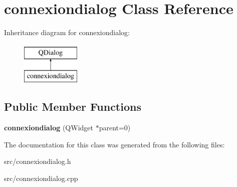 \hypertarget{classconnexiondialog}{\section{connexiondialog Class Reference}
\label{classconnexiondialog}
}
Inheritance diagram for connexiondialog\+:\begin{figure}[H]
\begin{center}
\leavevmode
\includegraphics[height=2.000000cm]{dc/db6/classconnexiondialog}
\end{center}
\end{figure}
\subsection*{Public Member Functions}
\begin{DoxyCompactItemize}
\item 
\hypertarget{classconnexiondialog_a96f24b7b0ed87e2cbe4866d1b931710e}{{\bfseries connexiondialog} (Q\+Widget $\ast$parent=0)}\label{classconnexiondialog_a96f24b7b0ed87e2cbe4866d1b931710e}

\end{DoxyCompactItemize}


The documentation for this class was generated from the following files\+:\begin{DoxyCompactItemize}
\item 
src/connexiondialog.\+h\item 
src/connexiondialog.\+cpp\end{DoxyCompactItemize}
